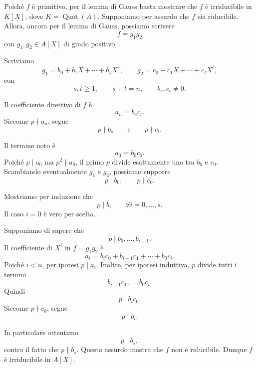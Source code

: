 \documentclass[a4paper]{article}
\begin{document}
\begin{snippetproof}{}
    Poiché \(f\) è primitivo, per il lemma di Gauss basta mostrare che \(f\) è irriducibile in \(K[X]\), dove \(K=\operatorname{Quot}(A)\).
    Supponiamo per assurdo che \(f\) sia riducibile. Allora, ancora per il lemma di Gauss, possiamo scrivere
    \[
        f=g_1g_2
    \]
    con \(g_1,g_2\in A[X]\) di grado positivo.

    Scriviamo
    \[
        g_1=b_0+b_1X+\cdots+b_sX^s,
        \qquad
        g_2=c_0+c_1X+\cdots+c_tX^t,
    \]
    con
    \[
        s,t\geq 1,
        \qquad
        s+t=n,
        \qquad
        b_s,c_t\neq 0.
    \]

    Il coefficiente direttivo di \(f\) è
    \[
        a_n=b_sc_t.
    \]
    Siccome \(p\nmid a_n\), segue
    \[
        p\nmid b_s
        \qquad
        \text{e}
        \qquad
        p\nmid c_t.
    \]

    Il termine noto è
    \[
        a_0=b_0c_0.
    \]
    Poiché \(p\mid a_0\) ma \(p^2\nmid a_0\), il primo \(p\) divide esattamente uno tra \(b_0\) e \(c_0\).
    Scambiando eventualmente \(g_1\) e \(g_2\), possiamo supporre
    \[
        p\mid b_0,
        \qquad
        p\nmid c_0.
    \]

    Mostriamo per induzione che
    \[
        p\mid b_i
        \qquad
        \forall i=0,\ldots,s.
    \]
    Il caso \(i=0\) è vero per scelta.

    Supponiamo di sapere che
    \[
        p\mid b_0,\ldots,b_{i-1}.
    \]
    Il coefficiente di \(X^i\) in \(f=g_1g_2\) è
    \[
        a_i=b_ic_0+b_{i-1}c_1+\cdots+b_0c_i.
    \]
    Poiché \(i<n\), per ipotesi \(p\mid a_i\). Inoltre, per ipotesi induttiva, \(p\) divide tutti i termini
    \[
        b_{i-1}c_1,\ldots,b_0c_i.
    \]
    Quindi
    \[
        p\mid b_ic_0.
    \]
    Siccome \(p\nmid c_0\), segue
    \[
        p\mid b_i.
    \]

    In particolare otteniamo
    \[
        p\mid b_s,
    \]
    contro il fatto che \(p\nmid b_s\).
    Questo assurdo mostra che \(f\) non è riducibile. Dunque \(f\) è irriducibile in \(A[X]\).
\end{snippetproof}
\end{document}
